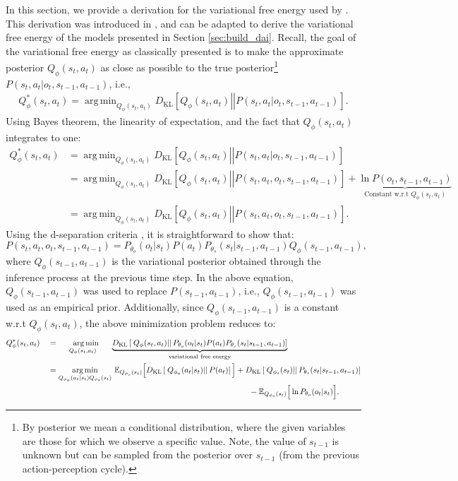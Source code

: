 \documentclass[twoside,11pt]{article}
\newcommand{\kl}[2]{D_{\mathrm{KL}} \left[ \left. \left. #1 \right|\right| #2 \right] }
\DeclareMathOperator*{\argmin}{arg\,min}
\begin{document}
In this section, we provide a derivation for the variational free energy used by \citet{DeepAIwithMCMC}. This derivation was introduced in \citep{DeepAI}, and can be adapted to derive the variational free energy of the models presented in Section \ref{sec:build_dai}. Recall, the goal of the variational free energy as classically presented is to make the approximate posterior $Q_\phi(s_t,a_t)$ as close as possible to the true posterior\footnote{By posterior we mean a conditional distribution, where the given variables are those for which we observe a specific value. Note, the value of $s_{t-1}$ is unknown but can be sampled from the posterior over $s_{t-1}$ (from the previous action-perception cycle).} $P(s_t,a_t|o_t,s_{t-1},a_{t-1})$, i.e.,
\begin{align*}
Q^*_\phi(s_t,a_t) = \argmin_{Q_\phi(s_t,a_t)} \kl{Q_\phi(s_t,a_t)}{P(s_t,a_t|o_t,s_{t-1},a_{t-1})}.
\end{align*}
Using Bayes theorem, the linearity of expectation, and the fact that $Q_\phi(s_t,a_t)$ integrates to one:
\begin{align*}
Q_\phi^*(s_t,a_t) &= \argmin_{Q_\phi(s_t,a_t)} \kl{Q_\phi(s_t,a_t)}{P(s_t,a_t|o_t,s_{t-1},a_{t-1})}\\
&= \argmin_{Q_\phi(s_t,a_t)} \kl{Q_\phi(s_t,a_t)}{P(s_t,a_t,o_t,s_{t-1},a_{t-1})} + \underbrace{\ln P(o_t,s_{t-1},a_{t-1})}_{\text{Constant w.r.t }Q_\phi(s_t,a_t)}\\
&= \argmin_{Q_\phi(s_t,a_t)} \kl{Q_\phi(s_t,a_t)}{P(s_t,a_t,o_t,s_{t-1},a_{t-1})}.
\end{align*}
Using the d-separation criteria \citep{koller2009probabilistic}, it is straightforward to show that:
$$P(s_t,a_t,o_t,s_{t-1},a_{t-1}) = P_{\theta_o}(o_t|s_t)P(a_t)P_{\theta_s}(s_t|s_{t-1},a_{t-1})Q_{\phi}(s_{t-1}, a_{t-1}),$$
where $Q_\phi(s_{t-1}, a_{t-1})$ is the variational posterior obtained through the inference process at the previous time step. In the above equation, $Q_\phi(s_{t-1}, a_{t-1})$ was used to replace $P(s_{t-1}, a_{t-1})$, i.e., $Q_\phi(s_{t-1}, a_{t-1})$ was used as an empirical prior. Additionally, since $Q_\phi(s_{t-1}, a_{t-1})$ is a constant w.r.t $Q_\phi(s_t,a_t)$, the above minimization problem reduces to:
\begin{align}
Q^*_{\phi}(s_t,a_t)\quad &= \,\, \argmin_{\quad Q_{\phi}(s_t,a_t) \,\,\,\,\,\, \quad }\underbrace{\kl{Q_{\phi}(s_t,a_t)}{P_{\theta_o}(o_t|s_t)P(a_t)P_{\theta_s}(s_t|s_{t-1},a_{t-1})}}_{\text{variational free energy}}\label{eq:def_vfe_fountas}\\
&= \argmin_{Q_{\phi_a}(a_t|s_t)Q_{\phi_s}(s_t)}\, \mathbb{E}_{Q_{\phi_s}(s_t)}\Big[ \kl{Q_{\phi_a}(a_t|s_t)}{P(a_t)} \Big] + \kl{Q_{\phi_s}(s_t)}{P_{\theta_s}(s_t|s_{t-1},a_{t-1})}\nonumber\\
&\hspace{8.9cm}- \mathbb{E}_{Q_{\phi_s}(s_t)}\Big[\ln P_{\theta_o}(o_t|s_t)\Big].\nonumber
\end{align}
\end{document}
